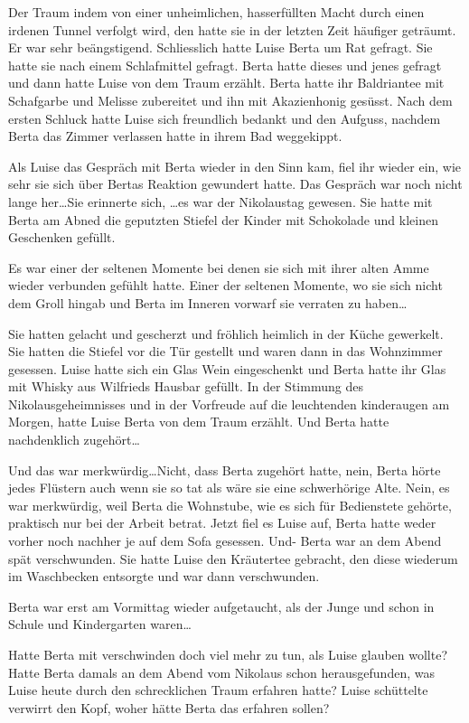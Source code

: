 Der Traum indem \am von einer unheimlichen, hasserfüllten Macht durch einen irdenen Tunnel verfolgt wird, den hatte sie in der letzten Zeit häufiger geträumt. Er war sehr beängstigend. Schliesslich hatte Luise Berta um Rat gefragt. Sie hatte sie nach einem Schlafmittel gefragt. Berta hatte dieses und jenes gefragt und dann hatte Luise von dem Traum erzählt. Berta hatte ihr Baldriantee mit Schafgarbe und Melisse  zubereitet und ihn mit Akazienhonig gesüsst. Nach dem ersten Schluck hatte Luise sich freundlich bedankt und den Aufguss, nachdem Berta das Zimmer verlassen hatte in ihrem Bad weggekippt.

Als Luise das Gespräch mit Berta wieder in den Sinn kam, fiel ihr wieder ein, wie sehr sie sich über Bertas Reaktion gewundert hatte. Das Gespräch war noch nicht lange her\dots Sie erinnerte sich, \dots es war der Nikolaustag gewesen. Sie hatte mit Berta am Abned die geputzten Stiefel der Kinder mit Schokolade und kleinen Geschenken gefüllt. 

Es war einer der seltenen Momente bei denen sie sich mit ihrer alten Amme wieder verbunden gefühlt hatte. Einer der seltenen Momente, wo sie sich nicht dem Groll hingab und Berta im Inneren vorwarf sie verraten zu haben\dots

Sie hatten gelacht und gescherzt und fröhlich heimlich in der Küche gewerkelt. Sie hatten die Stiefel vor die Tür gestellt und waren dann in das Wohnzimmer gesessen. Luise hatte sich ein Glas Wein eingeschenkt und Berta hatte ihr Glas mit Whisky aus Wilfrieds Hausbar gefüllt. In der Stimmung des Nikolausgeheimnisses und in der Vorfreude auf die leuchtenden kinderaugen am Morgen, hatte Luise Berta von dem Traum erzählt. Und Berta hatte nachdenklich zugehört\dots 

Und das war merkwürdig\dots Nicht, dass Berta zugehört hatte, nein, Berta hörte jedes Flüstern auch wenn sie so tat als wäre sie eine schwerhörige Alte. Nein, es war merkwürdig, weil Berta die Wohnstube, wie es sich für Bedienstete gehörte, praktisch nur bei der Arbeit betrat. Jetzt fiel es Luise auf, Berta hatte weder vorher noch nachher je auf dem Sofa gesessen. Und- Berta war an dem Abend spät verschwunden. Sie hatte Luise den Kräutertee gebracht, den diese wiederum im Waschbecken entsorgte und war dann verschwunden.

Berta war erst am Vormittag wieder aufgetaucht, als der Junge und \am schon in Schule und Kindergarten waren\dots

Hatte Berta mit \am verschwinden doch viel mehr zu tun, als Luise glauben wollte? Hatte Berta damals an dem Abend vom Nikolaus schon herausgefunden, was Luise heute durch den schrecklichen Traum erfahren hatte? Luise schüttelte verwirrt den Kopf, woher hätte Berta das erfahren sollen?

